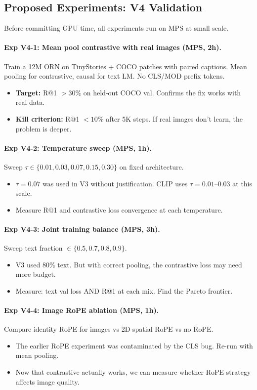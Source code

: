 \documentclass[11pt, a4paper]{article}
\theoremstyle{plain}
\theoremstyle{remark}
\begin{document}
\subsection{Proposed Experiments: V4 Validation}

Before committing GPU time, all experiments run on MPS at small scale.

\paragraph{Exp V4-1: Mean pool contrastive with real images (MPS, 2h).}
Train a 12M ORN on TinyStories + COCO patches with paired captions.
Mean pooling for contrastive, causal for text LM.
No CLS/MOD prefix tokens.
\begin{itemize}[nosep]
\item \textbf{Target:} R@1 $> 30\%$ on held-out COCO val. Confirms the fix works with real data.
\item \textbf{Kill criterion:} R@1 $< 10\%$ after 5K steps. If real images don't learn, the problem is deeper.
\end{itemize}

\paragraph{Exp V4-2: Temperature sweep (MPS, 1h).}
Sweep $\tau \in \{0.01, 0.03, 0.07, 0.15, 0.30\}$ on fixed architecture.
\begin{itemize}[nosep]
\item $\tau = 0.07$ was used in V3 without justification. CLIP uses $\tau = 0.01$--$0.03$ at this scale.
\item Measure R@1 and contrastive loss convergence at each temperature.
\end{itemize}

\paragraph{Exp V4-3: Joint training balance (MPS, 3h).}
Sweep text fraction $\in \{0.5, 0.7, 0.8, 0.9\}$.
\begin{itemize}[nosep]
\item V3 used $80\%$ text. But with correct pooling, the contrastive loss may need more budget.
\item Measure: text val loss AND R@1 at each mix. Find the Pareto frontier.
\end{itemize}

\paragraph{Exp V4-4: Image RoPE ablation (MPS, 1h).}
Compare identity RoPE for images vs 2D spatial RoPE vs no RoPE.
\begin{itemize}[nosep]
\item The earlier RoPE experiment was contaminated by the CLS bug. Re-run with mean pooling.
\item Now that contrastive actually works, we can measure whether RoPE strategy affects image quality.
\end{itemize}
\end{document}
